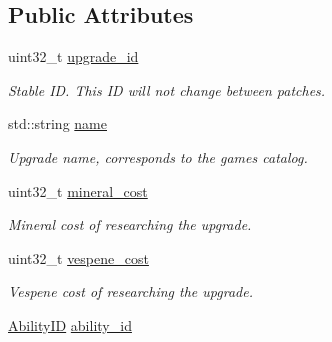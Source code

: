 \subsection*{Public Attributes}
\begin{DoxyCompactItemize}
\item 
\mbox{\label{structsc2_1_1_upgrade_data_a029e671b0ca85d874b3723cae5f9b9ef}} 
uint32\+\_\+t \hyperlink{structsc2_1_1_upgrade_data_a029e671b0ca85d874b3723cae5f9b9ef}{upgrade\+\_\+id}
\begin{DoxyCompactList}\small\item\em Stable ID. This ID will not change between patches. \end{DoxyCompactList}\item 
\mbox{\label{structsc2_1_1_upgrade_data_a8d8a126e4bee8c434bad896d3ac2c9be}} 
std\+::string \hyperlink{structsc2_1_1_upgrade_data_a8d8a126e4bee8c434bad896d3ac2c9be}{name}
\begin{DoxyCompactList}\small\item\em Upgrade name, corresponds to the game\textquotesingle{}s catalog. \end{DoxyCompactList}\item 
\mbox{\label{structsc2_1_1_upgrade_data_ae33d6c11380dd7c54f602285ec2c2a4d}} 
uint32\+\_\+t \hyperlink{structsc2_1_1_upgrade_data_ae33d6c11380dd7c54f602285ec2c2a4d}{mineral\+\_\+cost}
\begin{DoxyCompactList}\small\item\em Mineral cost of researching the upgrade. \end{DoxyCompactList}\item 
\mbox{\label{structsc2_1_1_upgrade_data_a678af2926b21ec88dc59459ac1695c52}} 
uint32\+\_\+t \hyperlink{structsc2_1_1_upgrade_data_a678af2926b21ec88dc59459ac1695c52}{vespene\+\_\+cost}
\begin{DoxyCompactList}\small\item\em Vespene cost of researching the upgrade. \end{DoxyCompactList}\item 
\mbox{\label{structsc2_1_1_upgrade_data_a460ded61dfae1ad19845ff12cc4b7f86}} 
\hyperlink{classsc2_1_1_s_c2_type}{Ability\+ID} \hyperlink{structsc2_1_1_upgrade_data_a460ded61dfae1ad19845ff12cc4b7f86}{ability\+\_\+id}

\end{DoxyCompactItemize}
